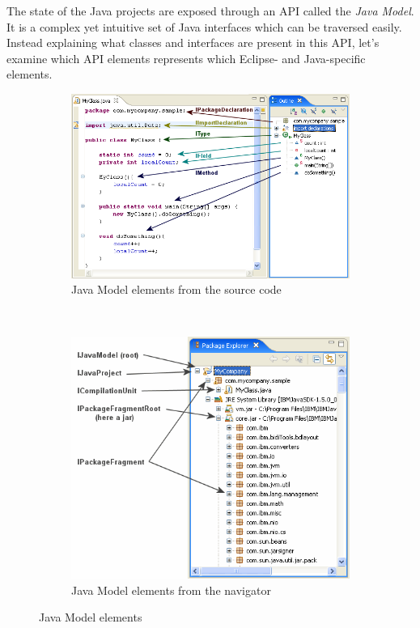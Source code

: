 The state of the Java projects are exposed through an API called the \emph{Java
Model}. It is a complex yet intuitive set of Java interfaces which can be
traversed easily. Instead explaining what classes and interfaces are present in
this API, let's examine which API elements represents which Eclipse- and
Java-specific elements.
\begin{figure} 
        \centering
        \begin{subfigure}[b]{0.5\textwidth}
                \centering
                \includegraphics[width=\textwidth]{figures/javamodel2.png}
                \caption{Java Model elements from the source code}
                \label{fig:javamodel2.png}
        \end{subfigure}~
        \begin{subfigure}[b]{0.5\textwidth}
                \centering
                \includegraphics[width=\textwidth]{figures/javamodel1.png}
                \caption{Java Model elements from the navigator}
                \label{fig:javamodel1.png}
        \end{subfigure}
        \caption{Java Model elements}\label{fig:javamodel}
\end{figure}
